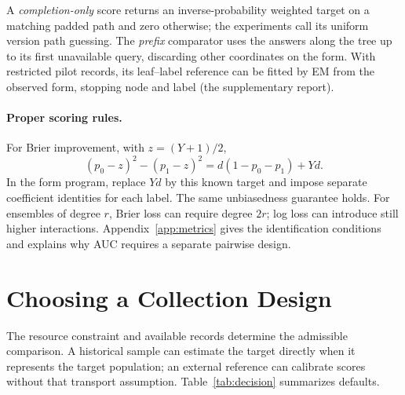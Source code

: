 A \emph{completion-only} score returns an inverse-probability weighted target on a matching padded path and zero otherwise; the experiments call its uniform version path guessing. The \emph{prefix} comparator uses the answers along the tree up to its first unavailable query, discarding other coordinates on the form. With restricted pilot records, its leaf--label reference can be fitted by EM from the observed form, stopping node and label (the supplementary report).

\paragraph{Proper scoring rules.}
For Brier improvement, with $z=(Y+1)/2$,
\[
 (p_0-z)^2-(p_1-z)^2=d(1-p_0-p_1)+Yd.
\]
In the form program, replace $Yd$ by this known target and impose separate coefficient identities for each label. The same unbiasedness guarantee holds. For ensembles of degree $r$, Brier loss can require degree $2r$; log loss can introduce still higher interactions. Appendix~\ref{app:metrics} gives the identification conditions and explains why AUC requires a separate pairwise design.

\section{Choosing a Collection Design}\label{sec:guidance}
The resource constraint and available records determine the admissible comparison. A historical sample can estimate the target directly when it represents the target population; an external reference can calibrate scores without that transport assumption. Table~\ref{tab:decision} summarizes defaults.

